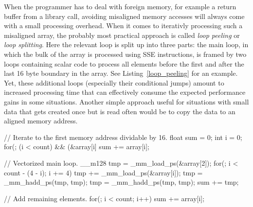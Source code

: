 When the programmer has to deal with foreign memory, for example a return buffer from a library call, avoiding misaligned memory accesses will always come with a small processing overhead. When it comes to iterativly processing such a misaligned array, the probably most practical approach is called \emph{loop peeling} or \emph{loop splitting}. Here the relevant loop is split up into three parts: the main loop, in which the bulk of the array is processed using SSE instructions, is framed by two loops containing scalar code to process all elements before the first and after the last 16 byte boundary in the array. See Listing~\ref{loop_peeling} for an example. Yet, these additional loops (especially their conditional jumps) amount to increased processing time that can effectively consume the expected performance gains in some situations. Another simple approach useful for situations with small data that gets created once but is read often would be to copy the data to an aligned memory address.

\begin{code}[caption={Loop peeling example}, label=loop_peeling]
  // Iterate to the first memory address dividable by 16.
  float sum = 0;
  int i = 0;
  for(; (i < count) && (&array[i] %
    sum += array[i];

  // Vectorized main loop.
  __m128 tmp = _mm_load_ps(&array[2]);
  for(; i < count - (4 - i); i += 4) {
    tmp += _mm_load_ps(&array[i]);
  }
  tmp = _mm_hadd_ps(tmp, tmp);
  tmp = _mm_hadd_ps(tmp, tmp);
  sum += tmp;

  // Add remaining elements.
  for(; i < count; i++)
    sum += array[i];
\end{code}

